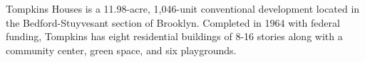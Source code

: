 Tompkins Houses is a 11.98-acre, 1,046-unit conventional development located in the Bedford-Stuyvesant section of Brooklyn. Completed in 1964 with federal funding, Tompkins has eight residential buildings of 8-16 stories along with a community center, green space, and six playgrounds.
